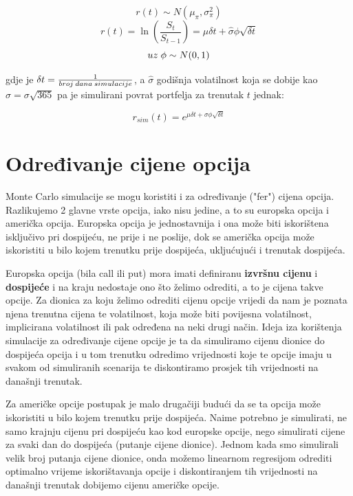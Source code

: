 \documentclass[times, utf8, seminar]{fer}
\begin{document}
\[ r(t) \sim N(\mu_{\pi}, \sigma_{\pi}^2)\]
\[ r(t) = \ln(\frac{S_{t}}{S_{t-1}}) = \mu\delta t + \hat{\sigma}\phi\sqrt{\delta t}\]
\[ uz \hspace{0.1cm} \phi \sim N(0,1) \]


\noindent gdje je $\delta t = \frac{1}{broj \hspace{0.07cm} dana \hspace{0.07cm} simulacije}$, a $\hat{\sigma}$ godišnja volatilnost koja se dobije kao $\hat{\sigma} = \sigma\sqrt{365}$ pa je simulirani povrat portfelja za trenutak $t$ jednak:

\[ r_{sim}(t) = e^{\mu\delta t + \sigma\phi\sqrt{\delta t}} \]

\section{Određivanje cijene opcija}
Monte Carlo simulacije se mogu koristiti i za određivanje ("fer") cijena opcija. Razlikujemo 2 glavne vrste opcija, iako nisu jedine, a to su europska opcija i američka opcija. Europska opcija je jednostavnija i ona može biti iskorištena  isključivo pri dospijeću, ne prije i ne poslije, dok se američka opcija može iskoristiti u bilo kojem trenutku prije dospijeća, ukljućujući i trenutak dospijeća.

Europska opcija (bila call ili put) mora imati definiranu \textbf{izvršnu cijenu} i \textbf{dospijeće} i na kraju nedostaje ono što želimo odrediti, a to je cijena takve opcije. Za dionica za koju želimo odrediti cijenu opcije vrijedi da nam je poznata njena trenutna cijena te volatilnost, koja može biti povijesna volatilnost, implicirana volatilnost ili pak određena na neki drugi način. Ideja iza korištenja simulacije za određivanje cijene opcije je ta da simuliramo cijenu dionice do dospijeća opcija i u tom trenutku odredimo vrijednosti koje te opcije imaju u svakom od simuliranih scenarija te diskontiramo prosjek tih vrijednosti na današnji trenutak.

Za američke opcije postupak je malo drugačiji budući da se ta opcija može iskoristiti u bilo kojem trenutku prije dospijeća. Naime potrebno je simulirati, ne samo krajnju cijenu pri dospijeću kao kod europske opcije, nego simulirati cijene za svaki dan do dospijeća (putanje cijene dionice). Jednom kada smo simulirali velik broj putanja cijene dionice, onda možemo linearnom regresijom odrediti optimalno vrijeme iskorištavanja opcije i diskontiranjem tih vrijednosti na današnji trenutak dobijemo cijenu američke opcije.
\end{document}
